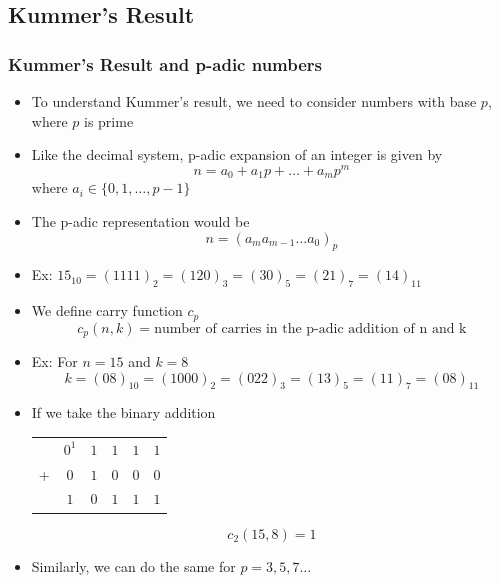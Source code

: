 \documentclass{beamer}
\begin{document}
\subsection{Kummer's Result}
\begin{frame}
    \frametitle{Kummer's Result and p-adic numbers}
    \begin{itemize}
        \item To understand Kummer's result, we need to consider numbers with base $p$, where $p$ is prime 
        \item Like the decimal system, p-adic expansion of an integer is given by
        \begin{equation*}
            n = a_0 + a_1p +\dots + a_m p^m
        \end{equation*}
        where $a_i \in \{0,1,\dots,p-1\}$
        \item The p-adic representation would be 
        \begin{equation*}
            n = (a_m a_{m-1} \dots a_0)_p
        \end{equation*} 
        \item Ex: $15_{10} = (1111)_2 = (120)_3 = (30)_5 = (21)_7 = (14)_{11}$ 
    \end{itemize}
\end{frame}

\begin{frame}
    \begin{itemize}
        \item We define carry function $c_p$
        \begin{equation*}
            c_p(n,k) = \text{number of carries in the p-adic addition of n and k}
        \end{equation*}
        \item Ex: For $n = 15$ and $k=8$
        \begin{equation*}
            k=(08)_{10}=(1000)_{2}=(022)_{3}=(13)_{5}=(11)_{7}=(08)_{11}
        \end{equation*}
        \item If we take the binary addition
        \begin{tabular}{cccccc}
            & $0^1$ & $1$ & $1$ & $1$ & $1$ \\
            + & $0$ & $1$ & $0$ & $0$ & $0$ \\
            \hline
            & $1$ & $0$ & $1$ & $1$ & $1$ 
        \end{tabular}
        \begin{equation*}
            c_2(15,8) = 1
        \end{equation*}
        \item Similarly, we can do the same for $p=3,5,7\dots$
    \end{itemize}
\end{frame}
\end{document}
